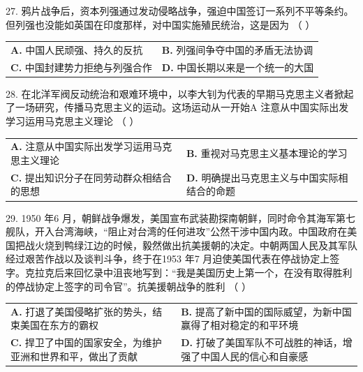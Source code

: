 \documentclass[UTF8,11pt]{ctexart}
\begin{document}
27. 鸦片战争后，资本列强通过发动侵略战争，强迫中国签订一系列不平等条约。但列强也没能如英国在印度那样，对中国实施殖民统治，这是因为 （    ）


\begin{center}\begin{tabular}{>{\raggedright\arraybackslash}p{\dimexpr(\linewidth-4\tabcolsep)/2\relax}>{\raggedright\arraybackslash}p{\dimexpr(\linewidth-4\tabcolsep)/2\relax}}
\textbf{A.} 中国人民顽强、持久的反抗 & \textbf{B.} 列强间争夺中国的矛盾无法协调\\[.35em]
\textbf{C.} 中国封建势力拒绝与列强合作 & \textbf{D.} 中国长期以来是一个统一的大国\\[.35em]\end{tabular}\end{center}

28. 在北洋军阀反动统治和艰难环境中，以李大钊为代表的早期马克思主义者掀起了一场研究，传播马克思主义的运动。这场运动从一开始A 注意从中国实际出发学习运用马克思主义理论 （    ）


\begin{center}\begin{tabular}{>{\raggedright\arraybackslash}p{\dimexpr(\linewidth-4\tabcolsep)/2\relax}>{\raggedright\arraybackslash}p{\dimexpr(\linewidth-4\tabcolsep)/2\relax}}
\textbf{A.} 注意从中国实际出发学习运用马克思主义理论 & \textbf{B.} 重视对马克思主义基本理论的学习\\[.35em]
\textbf{C.} 提出知识分子在同劳动群众相结合的思想 & \textbf{D.} 明确提出马克思主义与中国实际相结合的命题\\[.35em]\end{tabular}\end{center}

29. 1950 年6 月，朝鲜战争爆发，美国宣布武装勘探南朝鲜，同时命令其海军第七舰队，开入台湾海峡，“阻止对台湾的任何进攻”公然干涉中国内政。中国政府在美国把战火烧到鸭绿江边的时候，毅然做出抗美援朝的决定。中朝两国人民及其军队经过艰苦作战以及谈判斗争，终于在1953 年7 月迫使美国代表在停战协定上签字。克拉克后来回忆录中沮丧地写到：“我是美国历史上第一个，在没有取得胜利的停战协定上签字的司令官”。抗美援朝战争的胜利 （    ）


\begin{center}\begin{tabular}{>{\raggedright\arraybackslash}p{\dimexpr(\linewidth-4\tabcolsep)/2\relax}>{\raggedright\arraybackslash}p{\dimexpr(\linewidth-4\tabcolsep)/2\relax}}
\textbf{A.} 打退了美国侵略扩张的势头，结束美国在东方的霸权 & \textbf{B.} 提高了新中国的国际威望，为新中国赢得了相对稳定的和平环境\\[.35em]
\textbf{C.} 捍卫了中国的国家安全，为维护亚洲和世界和平，做出了贡献 & \textbf{D.} 打破了美国军队不可战胜的神话，增强了中国人民的信心和自豪感\\[.35em]\end{tabular}\end{center}
\end{document}
